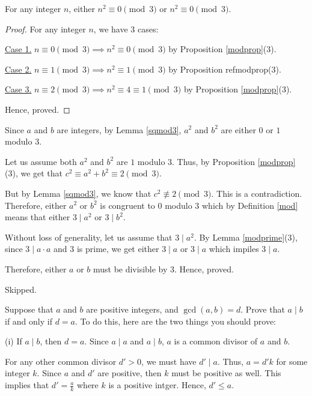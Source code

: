 \bs
	\begin{lemma} \label{sqmod3}
		For any integer $n$, either $n^2 \equiv 0 \pmod{3}$ or $n^2 \equiv 0 \pmod{3}$.
	\end{lemma}
	\begin{proof} 
		For any integer $n$, we have $3$ cases:

		\underline{Case 1.} $n \equiv 0 \pmod 3 \implies n^2 \equiv 0 \pmod{3}$ by Proposition \ref{modprop}(3).

		\underline{Case 2.} $n \equiv 1 \pmod 3 \implies n^2 \equiv 1 \pmod{3}$ by Proposition ref{modprop}(3).

		\underline{Case 3.} $n \equiv 2 \pmod 3 \implies n^2 \equiv 4 \equiv 1 \pmod{3}$ by Proposition \ref{modprop}(3).

		Hence, proved.
	\end{proof}

	Since $a$ and $b$ are integers, by Lemma \ref{sqmod3}, $a^2$ and $b^2$ are either $0$ or $1$ modulo $3$.

	Let us assume both $a^2$ and $b^2$ are $1$ modulo $3$. Thus, by Proposition \ref{modprop}(3), we get that $c^2 \equiv a^2 + b^2 \equiv 2 \pmod{3}$. 

	But by Lemma \ref{sqmod3}, we know that $c^2 \not\equiv 2 \pmod{3}$. This is a contradiction. Therefore, either $a^2$ or $b^2$ is congruent to $0$ modulo $3$ which by Definition \ref{mod} means that either $3 \mid a^2$ or $3 \mid b^2$.

	Without loss of generality, let us assume that $3 \mid a^2$.
	By Lemma \ref{modprime}(3), since $3 \mid a \cdot a$ and $3$ is prime, we get either $3 \mid a$ or $3 \mid a$ which impiles $3 \mid a$.

	Therefore, either $a$ or $b$ must be divisible by $3$. Hence, proved.
\es


\bp  Skipped. \ep 

\bp  Suppose that $a$ and $b$ are positive integers, and $\gcd(a, b) = d$. Prove that $a \mid b$ if and only if $d = a$. To do this, here are the two things you should prove:
	
	(i) If $a \mid b$, then $d = a$.
	\bs
		Since $a \mid a$ and $a \mid b$, $a$ is a common divisor of $a$ and $b$.

		For any other common divisor $d' > 0$, we must have $d' \mid a$. Thus, $a = d'k$ for some integer $k$. Since $a$ and $d'$ are positive, then $k$ must be positive as well. This implies that $d' = \frac{a}{k}$ where $k$ is a positive intger. Hence, $d' \leq a$.


